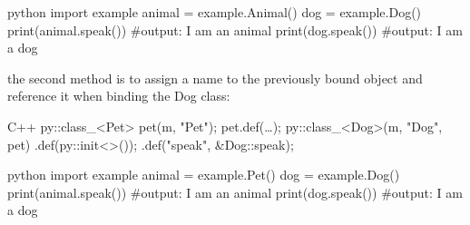 \begin{neonlisting}{python}
    import example
    animal = example.Animal()
    dog = example.Dog()
    print(animal.speak()) #output: I am an animal
    print(dog.speak()) #output: I am a dog
\end{neonlisting}

the second method is to assign a name to the previously bound  object and reference it when binding the Dog class:

\begin{neonlisting}[language=C++]{C++}
    py::class_<Pet> pet(m, "Pet");
    pet.def(\dots);
    py::class_<Dog>(m, "Dog", pet)
        .def(py::init<>());
        .def("speak", &Dog::speak);
\end{neonlisting}

\begin{neonlisting}{python}
    import example
    animal = example.Pet()
    dog = example.Dog()
    print(animal.speak()) #output: I am an animal
    print(dog.speak()) #output: I am a dog
\end{neonlisting}


